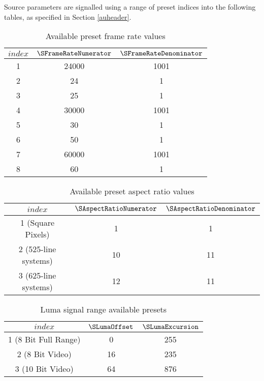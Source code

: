 \label{sourceparamspresets}

Source parameters are signalled using a range of preset indices into the following
tables, as specified in Section \ref{auheader}. 

\begin{table}[!ht]
\centering
\begin{tabular}{|c|c|c|}
\hline
$index$ & $\SFrameRateNumerator$ & $\SFrameRateDenominator$ \\
\hline
1 & 24000 & 1001 \\
\hline
2 & 24 & 1 \\
\hline
3 & 25 & 1 \\
\hline
4 & 30000 & 1001 \\
\hline
5 & 30 & 1 \\
\hline
6 & 50 & 1 \\
\hline
7 & 60000 & 1001 \\
\hline
8 & 60 & 1 \\
\hline
\end{tabular}
\caption{Available preset frame rate values}\label{table:frameratevalues}
\end{table}

\begin{table}[!ht]
\centering
\begin{tabular}{|c|c|c|}
\hline
$index$ & $\SAspectRatioNumerator$ & $\SAspectRatioDenominator$ \\
\hline
1 (Square Pixels) & 1 & 1 \\
\hline
2 (525-line systems) & 10 & 11 \\
\hline
3 (625-line systems) & 12 & 11 \\
\hline
\end{tabular}
\caption{Available preset aspect ratio values}\label{table:aspectratiovalues}
\end{table}

\begin{table}[!ht]
\centering
\begin{tabular}{|c|c|c|}
\hline
$index$ & $\SLumaOffset$ & $\SLumaExcursion$ \\
\hline
1 (8 Bit Full Range) & 0 & 255 \\
\hline
2 (8 Bit Video) & 16 & 235 \\
\hline
3 (10 Bit Video) & 64 & 876 \\
\hline
\end{tabular}
\caption{Luma signal range available presets}\label{table:lumasignalrangevalues}
\end{table}

